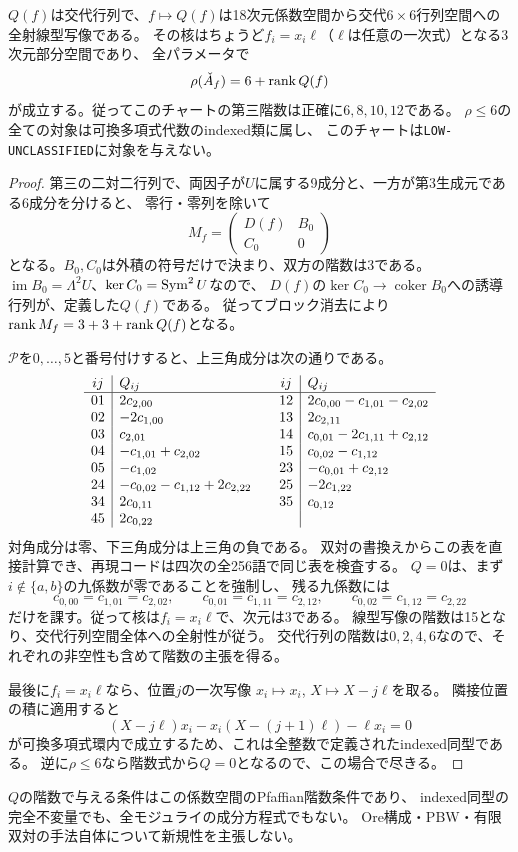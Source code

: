 \begin{theorem}[第三階数の交代行列判定]\label{thm:polynomial-ore-rank}
$Q(f)$は交代行列で、$f\mapsto Q(f)$は18次元係数空間から交代$6\times6$行列空間への全射線型写像である。
その核はちょうど$f_i=x_i\ell$（$\ell$は任意の一次式）となる3次元部分空間であり、
全パラメータで
\[
 \rho(\check A_f)=6+\operatorname{rank} Q(f)
\]
が成立する。従ってこのチャートの第三階数は正確に$6,8,10,12$である。
$\rho\leq6$の全ての対象は可換多項式代数のindexed類に属し、
このチャートは\texttt{LOW-UNCLASSIFIED}に対象を与えない。
\end{theorem}
\begin{proof}
第三の二対二行列で、両因子が$U$に属する9成分と、一方が第3生成元である6成分を分けると、
零行・零列を除いて
\[
 M_f=\begin{pmatrix}D(f)&B_0\\ C_0&0\end{pmatrix}
\]
となる。$B_0,C_0$は外積の符号だけで決まり、双方の階数は3である。
$\operatorname{im}B_0=\Lambda^2U$、$\ker C_0=\operatorname{Sym}^2U$なので、
$D(f)$の$\ker C_0\to\operatorname{coker}B_0$への誘導行列が、定義した$Q(f)$である。
従ってブロック消去により$\operatorname{rank} M_f=3+3+\operatorname{rank} Q(f)$となる。

$\mathcal P$を$0,\ldots,5$と番号付けすると、上三角成分は次の通りである。
\[
\begin{array}{c|l@{\qquad}c|l}
 ij&Q_{ij}&ij&Q_{ij}\\\hline
 01&2c_{2,00}&12&2c_{0,00}-c_{1,01}-c_{2,02}\\
 02&-2c_{1,00}&13&2c_{2,11}\\
 03&c_{2,01}&14&c_{0,01}-2c_{1,11}+c_{2,12}\\
 04&-c_{1,01}+c_{2,02}&15&c_{0,02}-c_{1,12}\\
 05&-c_{1,02}&23&-c_{0,01}+c_{2,12}\\
 24&-c_{0,02}-c_{1,12}+2c_{2,22}&25&-2c_{1,22}\\
 34&2c_{0,11}&35&c_{0,12}\\
 45&2c_{0,22}&&
\end{array}
\]
対角成分は零、下三角成分は上三角の負である。
双対の書換えからこの表を直接計算でき、再現コードは四次の全256語で同じ表を検査する。
$Q=0$は、まず$i\notin\{a,b\}$の九係数が零であることを強制し、
残る九係数には
\[
 c_{0,00}=c_{1,01}=c_{2,02},\qquad
 c_{0,01}=c_{1,11}=c_{2,12},\qquad
 c_{0,02}=c_{1,12}=c_{2,22}
\]
だけを課す。従って核は$f_i=x_i\ell$で、次元は3である。
線型写像の階数は15となり、交代行列空間全体への全射性が従う。
交代行列の階数は$0,2,4,6$なので、それぞれの非空性も含めて階数の主張を得る。

最後に$f_i=x_i\ell$なら、位置$j$の一次写像
$x_i\mapsto x_i$, $X\mapsto X-j\ell$を取る。
隣接位置の積に適用すると
\[
 (X-j\ell)x_i-x_i(X-(j+1)\ell)-\ell x_i=0
\]
が可換多項式環内で成立するため、これは全整数で定義されたindexed同型である。
逆に$\rho\leq6$なら階数式から$Q=0$となるので、この場合で尽きる。
\end{proof}
\begin{remark}
$Q$の階数で与える条件はこの係数空間のPfaffian階数条件であり、
indexed同型の完全不変量でも、全モジュライの成分方程式でもない。
Ore構成・PBW・有限双対の手法自体について新規性を主張しない。
\end{remark}

